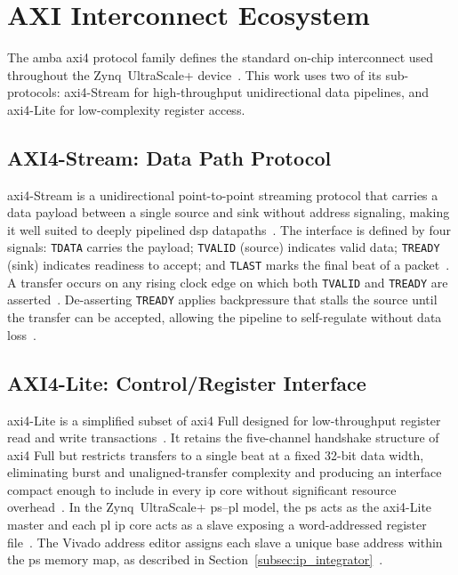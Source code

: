 


\section{AXI Interconnect Ecosystem}
\label{sec:axi}

The \ac{amba} \ac{axi}4 protocol family defines the standard on-chip
interconnect used throughout the Zynq~UltraScale+ device~\cite{ARM_IHI0022}.
This work uses two of its sub-protocols: \ac{axi}4-Stream for
high-throughput unidirectional data pipelines, and \ac{axi}4-Lite for
low-complexity register access.

\subsection{AXI4-Stream: Data Path Protocol}
\label{subsec:axis}

\ac{axi}4-Stream is a unidirectional point-to-point streaming protocol
that carries a data payload between a single source and sink without
address signaling, making it well suited to deeply pipelined \ac{dsp}
datapaths~\cite{ARM_IHI0022}.
The interface is defined by four signals: \texttt{TDATA} carries the
payload; \texttt{TVALID} (source) indicates valid data;
\texttt{TREADY} (sink) indicates readiness to accept; and
\texttt{TLAST} marks the final beat of a packet~\cite{ARM_IHI0022}.
A transfer occurs on any rising clock edge on which both
\texttt{TVALID} and \texttt{TREADY} are asserted~\cite{ARM_IHI0022}.
De-asserting \texttt{TREADY} applies backpressure that stalls the
source until the transfer can be accepted, allowing the pipeline to
self-regulate without data loss~\cite{ARM_IHI0022}.


\subsection{AXI4-Lite: Control/Register Interface}
\label{subsec:axilite}

\ac{axi}4-Lite is a simplified subset of \ac{axi}4 Full designed for
low-throughput register read and write transactions~\cite{ARM_IHI0022}.
It retains the five-channel handshake structure of \ac{axi}4 Full but
restricts transfers to a single beat at a fixed 32-bit data width,
eliminating burst and unaligned-transfer complexity and producing an
interface compact enough to include in every \ac{ip} core without
significant resource overhead~\cite{ARM_IHI0022}.
In the Zynq~UltraScale+ \ac{ps}--\ac{pl} model, the \ac{ps} acts as
the \ac{axi}4-Lite master and each \ac{pl} \ac{ip} core acts as a
slave exposing a word-addressed register file~\cite{AMD_UG1085}.
The Vivado address editor assigns each slave a unique base address
within the \ac{ps} memory map, as described in
Section~\ref{subsec:ip_integrator}~\cite{AMD_UG1085}.

